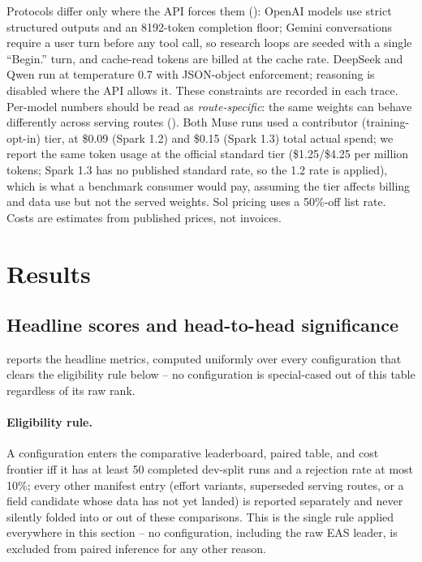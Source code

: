 \documentclass{article}
\begin{document}
Protocols differ only where the API forces them ():
OpenAI models use strict structured outputs and an 8192-token completion floor;
Gemini conversations require a user turn before any tool call, so research loops
are seeded with a single ``Begin.'' turn, and cache-read tokens are billed at the
cache rate. DeepSeek and Qwen run at temperature 0.7 with JSON-object enforcement;
reasoning is disabled where the API allows it. These constraints are recorded in
each trace. Per-model numbers should be read as \emph{route-specific}: the same
weights can behave differently across serving routes (). Both Muse
runs used a contributor (training-opt-in) tier, at \$0.09 (Spark 1.2) and \$0.15
(Spark 1.3) total actual spend; we report the same token usage at the official
standard tier (\$1.25/\$4.25 per million tokens; Spark 1.3 has no published standard
rate, so the 1.2 rate is applied), which is what a benchmark consumer would pay,
assuming the tier affects billing and data use but not the served weights. Sol pricing uses a 50\%-off list
rate. Costs are estimates from published prices, not invoices.


\section{Results}
\label{sec:results}

\subsection{Headline scores and head-to-head significance}
\label{sec:leaderboard}

 reports the headline metrics, computed uniformly over every
configuration that clears the eligibility rule below -- no configuration is
special-cased out of this table regardless of its raw rank.

\begin{table}
\centering
\caption{Headline metrics on the dev split, ordered by EAS, for the \FieldSize{}
field-eligible configurations. Arrows mark lower-is-better metrics; best per
column in bold. Cost is estimated at list pricing per episode.}
\label{tab:headline}
\small
\resizebox{\linewidth}{!}{}
\end{table}

\paragraph{Eligibility rule.} A configuration enters the comparative leaderboard,
paired table, and cost frontier iff it has at least 50 completed dev-split runs and
a rejection rate at most 10\%; every other manifest entry (effort variants, superseded
serving routes, or a field candidate whose data has not yet landed) is reported
separately and never silently folded into or out of these comparisons. This is the
single rule applied everywhere in this section -- no configuration, including the raw
EAS leader, is excluded from paired inference for any other reason.
\end{document}
